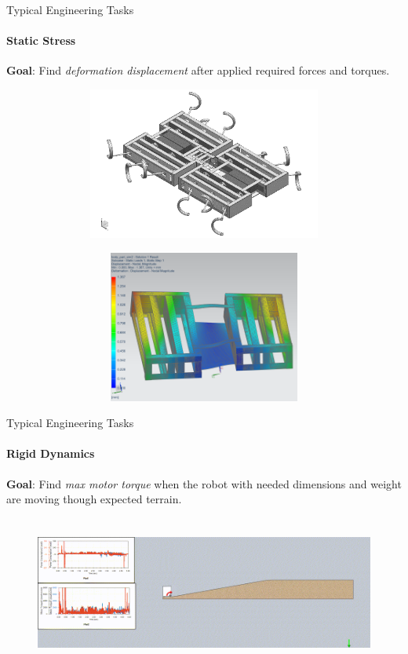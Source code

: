 \documentclass[aspectratio=169]{beamer}
\begin{document}
\begin{frame}[t]{Typical Engineering Tasks}
\framesubtitle{Static Stress}
\vspace{-0.3cm}
    \textbf{Goal}: Find \textit{deformation displacement} after applied required forces and torques.
    \begin{figure}[H]
        \begin{subfigure}{0.49\textwidth}
            \centering\includegraphics[height=5cm,width=1\textwidth,keepaspectratio]{cae_ex21.png}
            \label{fig:cae_ex21.png}
        \end{subfigure}
        \begin{subfigure}{0.49\textwidth}
            \centering\includegraphics[height=5cm,width=1\textwidth,keepaspectratio]{cae_ex22.png}
            \label{fig:cae_ex22.png}
        \end{subfigure}
    \end{figure}
\end{frame}

\begin{frame}[t]{Typical Engineering Tasks}
    \framesubtitle{Rigid Dynamics}
    \vspace{-0.3cm}
    \textbf{Goal}: Find \textit{max motor torque} when the robot with needed dimensions and weight are moving though expected terrain.
    \begin{figure}[H]
        \href{https://gifyu.com/image/S7Hm8}{
            \centering\includegraphics[height=5cm,width=1\textwidth,keepaspectratio]{cae_ex1_pic.png}}
        \label{fig:cae_ex1_pic.png}
    \end{figure}
\end{frame}
\end{document}
